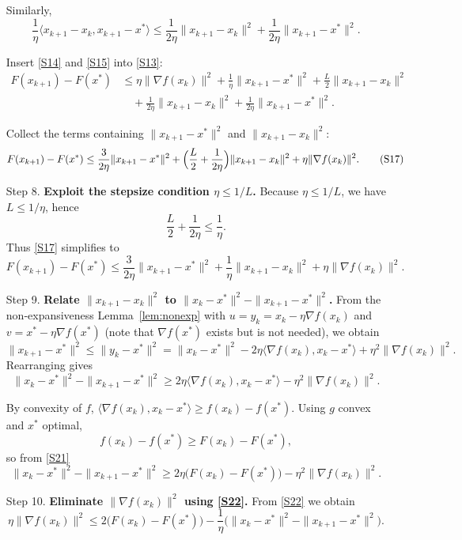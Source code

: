 \documentclass{article}
\begin{document}
\begin{enumerate}
Similarly,
\[
\frac{1}{\eta}\langle x_{k+1}-x_{k},x_{k+1}-x^{*}\rangle
\le \frac{1}{2\eta}\|x_{k+1}-x_{k}\|^{2}
    +\frac{1}{2\eta}\|x_{k+1}-x^{*}\|^{2}.
\tag{S15}
\]

Insert \eqref{S14} and \eqref{S15} into \eqref{S13}:
\[
\begin{aligned}
F(x_{k+1})-F(x^{*})
&\le \eta\|\nabla f(x_{k})\|^{2}
   +\frac{1}{\eta}\|x_{k+1}-x^{*}\|^{2}
   +\frac{L}{2}\|x_{k+1}-x_{k}\|^{2}\\
&\quad +\frac{1}{2\eta}\|x_{k+1}-x_{k}\|^{2}
   +\frac{1}{2\eta}\|x_{k+1}-x^{*}\|^{2}.
\end{aligned}
\tag{S16}
\]

Collect the terms containing $\|x_{k+1}-x^{*}\|^{2}$ and $\|x_{k+1}-x_{k}\|^{2}$:
\[
F(x_{k+1})-F(x^{*})
\le \frac{3}{2\eta}\|x_{k+1}-x^{*}\|^{2}
   +\Bigl(\frac{L}{2}+\frac{1}{2\eta}\Bigr)\|x_{k+1}-x_{k}\|^{2}
   +\eta\|\nabla f(x_{k})\|^{2}.
\tag{S17}
\]

\item[Step 8.] \textbf{Exploit the stepsize condition $\eta\le 1/L$.}
Because $\eta\le 1/L$, we have $L\le 1/\eta$, hence
\[
\frac{L}{2}+\frac{1}{2\eta}\le \frac{1}{\eta}.
\tag{S18}
\]
Thus \eqref{S17} simplifies to
\[
F(x_{k+1})-F(x^{*})
\le \frac{3}{2\eta}\|x_{k+1}-x^{*}\|^{2}
   +\frac{1}{\eta}\|x_{k+1}-x_{k}\|^{2}
   +\eta\|\nabla f(x_{k})\|^{2}.
\tag{S19}
\]

\item[Step 9.] \textbf{Relate $\|x_{k+1}-x_{k}\|^{2}$ to $\|x_{k}-x^{*}\|^{2}-\|x_{k+1}-x^{*}\|^{2}$.}
From the non‑expansiveness Lemma~\ref{lem:nonexp} with $u=y_{k}=x_{k}-\eta\nabla f(x_{k})$ and $v=x^{*}-\eta\nabla f(x^{*})$ (note that $\nabla f(x^{*})$ exists but is not needed), we obtain
\[
\|x_{k+1}-x^{*}\|^{2}
\le \|y_{k}-x^{*}\|^{2}
   =\|x_{k}-x^{*}\|^{2}
    -2\eta\langle\nabla f(x_{k}),x_{k}-x^{*}\rangle
    +\eta^{2}\|\nabla f(x_{k})\|^{2}.
\tag{S20}
\]
Rearranging gives
\[
\|x_{k}-x^{*}\|^{2}-\|x_{k+1}-x^{*}\|^{2}
\ge 2\eta\langle\nabla f(x_{k}),x_{k}-x^{*}\rangle-\eta^{2}\|\nabla f(x_{k})\|^{2}.
\tag{S21}
\]

By convexity of $f$, $\langle\nabla f(x_{k}),x_{k}-x^{*}\rangle\ge f(x_{k})-f(x^{*})$. Using $g$ convex and $x^{*}$ optimal,
\[
f(x_{k})-f(x^{*})\ge F(x_{k})-F(x^{*}),
\]
so from \eqref{S21}
\[
\|x_{k}-x^{*}\|^{2}-\|x_{k+1}-x^{*}\|^{2}
\ge 2\eta\bigl(F(x_{k})-F(x^{*})\bigr)-\eta^{2}\|\nabla f(x_{k})\|^{2}.
\tag{S22}
\]

\item[Step 10.] \textbf{Eliminate $\|\nabla f(x_{k})\|^{2}$ using \eqref{S22}.}
From \eqref{S22} we obtain
\[
\eta\|\nabla f(x_{k})\|^{2}
\le 2\bigl(F(x_{k})-F(x^{*})\bigr)-\frac{1}{\eta}\bigl(\|x_{k}-x^{*}\|^{2}-\|x_{k+1}-x^{*}\|^{2}\bigr).
\tag{S23}
\]


\end{enumerate}
\end{document}
